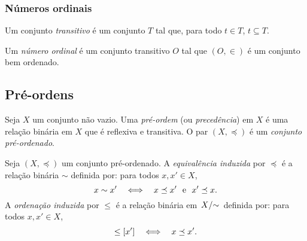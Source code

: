 \subsubsection{Números ordinais}

\begin{definition}
	Um conjunto \emph{transitivo} é um conjunto $T$ tal que, para todo $t \in T$, $t \subseteq T$.
\end{definition}

\begin{definition}
	Um \emph{número ordinal} é um conjunto transitivo $O$ tal que $(O,\in)$ é um conjunto bem ordenado.
\end{definition}






















\subsection{Pré-ordens}

\begin{definition}
Seja $X$ um conjunto não vazio. Uma \emph{pré-ordem} (ou \emph{precedência}) em $X$ é uma relação binária em $X$ que é reflexiva e transitiva. O par $(X,\preceq)$ é um \emph{conjunto pré-ordenado}.
\end{definition}

\begin{definition}
Seja $(X,\preceq)$ um conjunto pré-ordenado. A \emph{equivalência induzida} por $\preceq$ é a relação binária $\sim$ definida por: para todos $x,x' \in X$,
	\begin{equation*}
	x \sim x' \sse x \preceq x' \text{\ \ e\ \ } x' \preceq x.
	\end{equation*}
A \emph{ordenação induzida} por $\leq$ é a relação binária em $\quo{X}{\sim}$ definida por: para todos $x,x' \in X$,
	\begin{equation*}
	[x] \leq [x'] \sse x \preceq x'.
	\end{equation*}
\end{definition}

